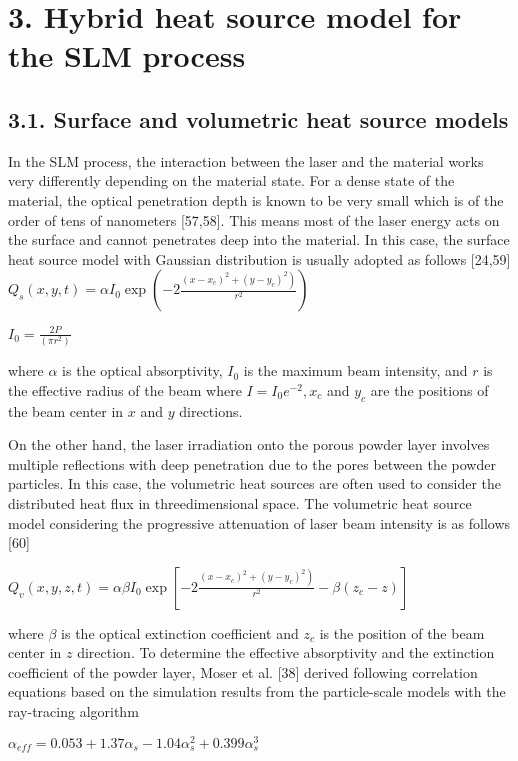 \documentclass[10pt]{article}
\begin{document}
\section*{3. Hybrid heat source model for the SLM process}
\subsection*{3.1. Surface and volumetric heat source models}
In the SLM process, the interaction between the laser and the material works very differently depending on the material state. For a dense state of the material, the optical penetration depth is known to be very small which is of the order of tens of nanometers [57,58]. This means most of the laser energy acts on the surface and cannot penetrates deep into the material. In this case, the surface heat source model with Gaussian distribution is usually adopted as follows [24,59]\\
$Q_{s}(x, y, t)=\alpha I_{0} \exp \left(-2 \frac{\left.\left(x-x_{c}\right)^{2}+\left(y-y_{c}\right)^{2}\right)}{r^{2}}\right)$

$I_{0}=\frac{2 P}{\left(\pi r^{2}\right)}$

where $\alpha$ is the optical absorptivity, $I_{0}$ is the maximum beam intensity, and $r$ is the effective radius of the beam where $I=I_{0} e^{-2}, x_{c}$ and $y_{c}$ are the positions of the beam center in $x$ and $y$ directions.

On the other hand, the laser irradiation onto the porous powder layer involves multiple reflections with deep penetration due to the pores between the powder particles. In this case, the volumetric heat sources are often used to consider the distributed heat flux in threedimensional space. The volumetric heat source model considering the progressive attenuation of laser beam intensity is as follows [60]

$Q_{v}(x, y, z, t)=\alpha \beta I_{0} \exp \left[-2 \frac{\left.\left(x-x_{c}\right)^{2}+\left(y-y_{c}\right)^{2}\right)}{r^{2}}-\beta\left(z_{c}-z\right)\right]$

where $\beta$ is the optical extinction coefficient and $z_{c}$ is the position of the beam center in $z$ direction. To determine the effective absorptivity and the extinction coefficient of the powder layer, Moser et al. [38] derived following correlation equations based on the simulation results from the particle-scale models with the ray-tracing algorithm

$\alpha_{e f f}=0.053+1.37 \alpha_{s}-1.04 \alpha_{s}^{2}+0.399 \alpha_{s}^{3}$
\end{document}

